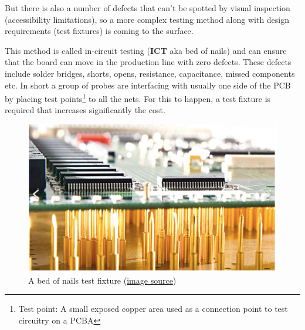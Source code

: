 \documentclass[final]{cubedoc}
\begin{document}
	But there is also a number of defects that can't be spotted by visual inspection (accessibility limitations), so a more complex testing method along with design requirements (test fixtures) is coming to the surface. 
	
	This method is called in-circuit testing (\textbf{ICT} aka bed of nails) and can ensure that the board can move in the production line with zero defects. These defects include solder bridges, shorts, opens, resistance, capacitance, missed components etc. In short a group of probes are interfacing with usually one side of the PCB  by placing test points\footnote{Test point: A small exposed copper area used as a connection point to test circuitry on a PCBA} to all the nets. For this to happen, a test fixture is required that increases significantly the cost.
	
	
	\begin{figure}[h!]
		\centering
		\includegraphics[keepaspectratio, width=\textwidth, height=.25\textheight]{assets/bed_of_nails.png}
		\caption{A bed of nails test fixture \small{(\href{https://web.archive.org/web/20200814200932/https://hackaday.com/2019/02/09/test-pcbs-on-a-bed-of-nails/}{image source}})}
	\end{figure}
	
\end{document}
